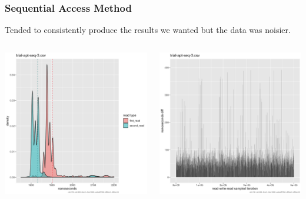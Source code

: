 \documentclass{beamer}
\begin{document}
\begin{frame}
 \frametitle{Sequential Access Method}
 Tended to consistently produce the results we wanted but the data was noisier.
 \begin{columns}
  \begin{column}{0.5\textwidth}
   \includegraphics[width=\linewidth]{trial-apt-seq-3-histogram.png}

  \end{column}
  \begin{column}{0.5\textwidth}
   \includegraphics[width=\linewidth]{trial-apt-seq-3-barchart.png}

  \end{column}

 \end{columns}
\end{frame}
\end{document}
